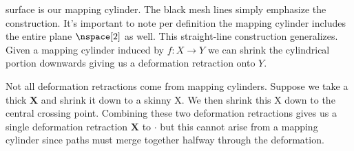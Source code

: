         surface is our mapping cylinder. The black mesh lines simply
        emphasize the construction. It's important to note per
        definition the mapping cylinder includes the entire plane
        $\nspace[2]$ as well. This straight-line construction
        generalizes. Given a mapping cylinder induced by
        $f:X\rightarrow{Y}$ we can shrink the cylindrical portion
        downwards giving us a deformation retraction onto $Y$.
        \par\hfill\par
        Not all deformation retractions come from mapping cylinders.
        Suppose we take a thick $\textbf{X}$ and shrink it down to a
        skinny X. We then shrink this X down to the central crossing
        point. Combining these two deformation retractions gives us a
        single deformation retraction $\textbf{X}$ to $\cdot$ but this
        cannot arise from a mapping cylinder since paths must merge
        together halfway through the deformation.
